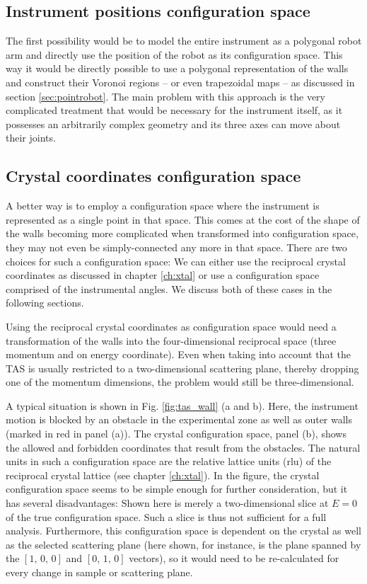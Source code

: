 \subsection{Instrument positions configuration space}
The first possibility would be to model the entire instrument as a polygonal 
robot arm and directly use the position of the robot as its configuration space. 
This way it would be directly possible to use a polygonal representation of the 
walls and construct their Voronoi regions -- or even trapezoidal maps -- as 
discussed in section \ref{sec:pointrobot}. The main problem with this approach 
is the very complicated treatment that would be necessary for the instrument 
itself, as it possesses an arbitrarily complex geometry and its three axes
can move about their joints.


\subsection{Crystal coordinates configuration space}
A better way is to employ a configuration space where the instrument is represented 
as a single point in that space. 
This comes at the cost of the shape of the walls becoming more complicated when 
transformed into configuration space, they may not even be simply-connected 
any more in that space. 
There are two choices for such a configuration space: We can either use the 
reciprocal crystal coordinates as discussed in chapter \ref{ch:xtal} or use a 
configuration space comprised of the instrumental angles.
We discuss both of these cases in the following sections.

Using the reciprocal crystal coordinates as configuration space would need a 
transformation of the walls into the four-dimensional reciprocal space 
(three momentum and on energy coordinate). Even when taking into account that 
the TAS is usually restricted to a two-dimensional scattering plane, thereby 
dropping one of the momentum dimensions, the problem would still be three-dimensional.

A typical situation is shown in Fig. \ref{fig:tas_wall} (a and b). 
Here, the instrument motion is blocked by an obstacle in the experimental zone
as well as outer walls (marked in red in panel (a)).
The crystal configuration space, panel (b), shows the allowed and forbidden
coordinates that result from the obstacles. The natural units in such a
configuration space are the relative lattice units (rlu) of the reciprocal
crystal lattice (see chapter \ref{ch:xtal}).
In the figure, the crystal configuration space seems to be simple enough for 
further consideration, but it has several disadvantages: Shown here is merely
a two-dimensional slice at $E = 0$ of the true configuration space.
Such a slice is thus not sufficient for a full analysis.
Furthermore, this configuration space is dependent on the crystal as well as
the selected scattering plane (here shown, for instance, is the plane spanned
by the $\left[1,\,0,\,0\right]$ and $\left[0,\,1,\,0\right]$ vectors), so
it would need to be re-calculated for every change in sample or scattering
plane.


